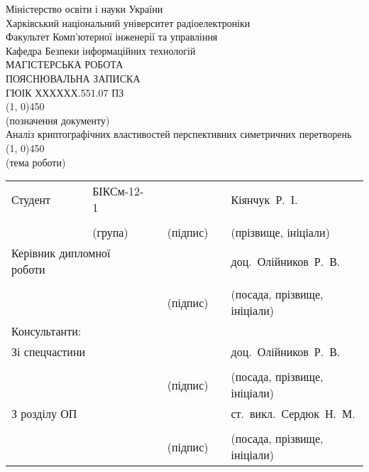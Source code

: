 
\thispagestyle{empty}
\begin{center}
    Міністерство освіти і науки України \\[1ex]
    Харківський національний університет радіоелектроніки \\[1ex] 
    Факультет Комп'ютерної інженерії та управління \\[1ex] 
    Кафедра Безпеки інформаційних технологій \\[2ex] 
    \MakeUppercase{Магістерська робота} \\[4ex]
    \MakeUppercase{Пояснювальна записка} \\[1ex]

    \MakeUppercase{ГЮІК ХХХХХХ.551.07 ПЗ} \\[-2ex]
    \line(1, 0){450} \\[-2ex]
    {\scriptsize (позначення документу)} \\[2ex]

    Аналіз криптографічних властивостей перспективних симетричних перетворень \\[-2ex]
    \line(1, 0){450} \\[-2ex]
    {\scriptsize (тема роботи)} \\[2ex]

    \begin{tabular}{ 
        p{}
        >{\centering\arraybackslash}p{} 
        >{\centering\arraybackslash}p{} 
        >{\centering\arraybackslash}p{}
        >{\centering\arraybackslash}p{} 
        >{\centering\arraybackslash}p{}}
        Студент & БІКСм-12-1 & & & & Кіянчук~Р.~І. \\ \cline{2-2}\cline{4-4}\cline{6-6} \\[-4ex]
        & {\scriptsize (група)} & & {\scriptsize (підпис)} & & {\scriptsize (прізвище, ініціали)} \\[1ex]
        \multicolumn{2}{p{0.4\textwidth}}{Керівник дипломної роботи} & & & & доц.~Олійников~Р.~В. \\ \cline{4-4}\cline{6-6} \\[-4ex]
        & & & {\scriptsize (підпис)} & & {\scriptsize (посада, прізвище, ініціали)} \\
        Консультанти: & & & & & \\[1ex]
        \multicolumn{2}{p{0.4\textwidth}}{Зі спецчастини} & & & & доц.~Олійников~Р.~В. \\ \cline{4-4}\cline{6-6} \\[-4ex]
        & & & {\scriptsize (підпис)} & & {\scriptsize (посада, прізвище, ініціали)} \\[1ex]
        \multicolumn{2}{p{0.4\textwidth}}{З розділу ОП} & & & & ст.~викл.~Сердюк~Н.~М. \\ \cline{4-4}\cline{6-6} \\[-4ex]
        & & & {\scriptsize (підпис)} & & {\scriptsize (посада, прізвище, ініціали)} \\[1ex]
        \end{tabular}


\end{center}
